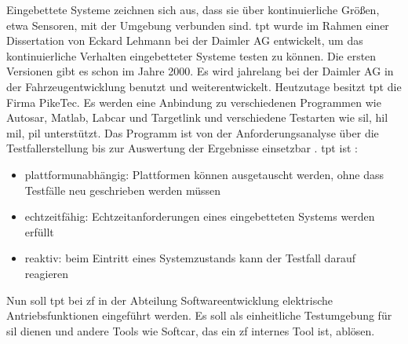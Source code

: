 Eingebettete Systeme zeichnen sich aus, dass sie über kontinuierliche Größen,
etwa Sensoren, mit der Umgebung verbunden sind. \ac{tpt} wurde im Rahmen einer Dissertation von Eckard Lehmann bei der Daimler AG entwickelt, 
um das kontinuierliche Verhalten eingebetteter Systeme testen zu können. Die ersten Versionen gibt es schon im Jahre 2000.
Es wird jahrelang bei der Daimler AG in der Fahrzeugentwicklung benutzt und weiterentwickelt. Heutzutage besitzt \ac{tpt} die Firma PikeTec. 
Es werden eine Anbindung zu verschiedenen Programmen wie Autosar, Matlab, Labcar und Targetlink und verschiedene Testarten wie \ac{sil}, \ac{hil} \ac{mil},
\ac{pil} unterstützt. Das Programm ist von der Anforderungsanalyse über die Testfallerstellung bis zur Auswertung der Ergebnisse einsetzbar \parencite[]{piketecwebseite}\parencite[]{tptwikipedia}.
\ac{tpt} ist \parencite[S. 120]{tpt}:
\begin{itemize}
\item plattformunabhängig: Plattformen können ausgetauscht werden, ohne dass Testfälle neu geschrieben werden müssen
\item echtzeitfähig: Echtzeitanforderungen eines eingebetteten Systems werden erfüllt
\item reaktiv: beim Eintritt eines Systemzustands kann der Testfall darauf reagieren
\end{itemize}
Nun soll \ac{tpt} bei \ac{zf} in der Abteilung Softwareentwicklung elektrische Antriebsfunktionen eingeführt werden.
Es soll als einheitliche Testumgebung für \ac{sil} dienen und andere Tools wie Softcar, das ein \ac{zf} internes Tool ist, ablösen.






